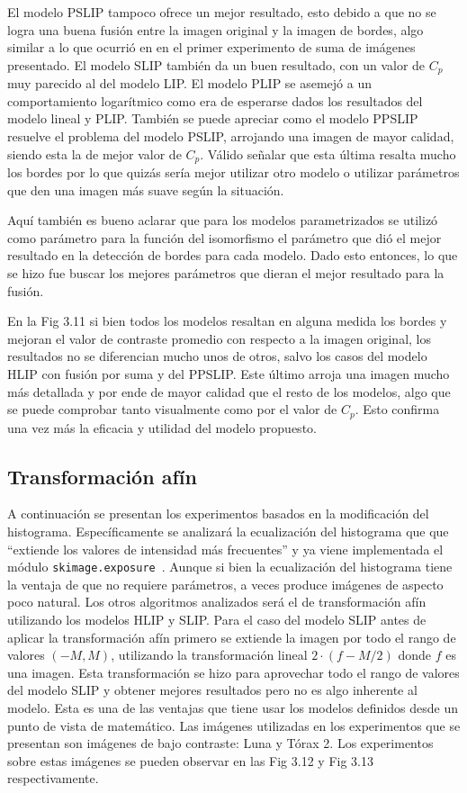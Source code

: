 El modelo PSLIP tampoco ofrece un mejor resultado, esto debido a que no se logra una buena fusi\'on entre la imagen original y la imagen de bordes, algo similar a lo que ocurri\'o en en el primer experimento de suma de im\'agenes presentado. El modelo SLIP tambi\'en da un buen resultado, con un valor de $C_p$ muy parecido al del modelo LIP. El modelo PLIP se asemej\'o a un comportamiento logar\'itmico como era de esperarse dados los resultados del modelo lineal y PLIP. Tambi\'en se puede apreciar como el modelo PPSLIP resuelve el problema del modelo PSLIP, arrojando una imagen de mayor calidad, siendo esta la de mejor valor de $C_p$. V\'alido se\~nalar que esta \'ultima resalta mucho los bordes por lo que quiz\'as ser\'ia mejor utilizar otro modelo o utilizar par\'ametros que den una imagen m\'as suave seg\'un la situaci\'on.

Aqu\'i tambi\'en es bueno aclarar que para los modelos parametrizados se utiliz\'o como par\'ametro para la funci\'on del isomorfismo el par\'ametro que di\'o el mejor resultado en la detecci\'on de bordes para cada modelo. Dado esto entonces, lo que se hizo fue buscar los mejores par\'ametros que dieran el mejor resultado para la fusi\'on.

En la Fig 3.11 si bien todos los modelos resaltan en alguna medida los bordes y mejoran el valor de contraste promedio con respecto a la imagen original, los resultados no se diferencian mucho unos de otros, salvo los casos del modelo HLIP con fusi\'on por suma y del PPSLIP. Este \'ultimo arroja una imagen mucho m\'as detallada y por ende de mayor calidad que el resto de los modelos, algo que se puede comprobar tanto visualmente como por el valor de $C_p$. Esto confirma una vez m\'as la eficacia y utilidad del modelo propuesto.

\subsection{Transformaci\'on af\'in}

A continuaci\'on se presentan los experimentos basados en la modificaci\'on del histograma. Espec\'ificamente se analizar\'a la ecualizaci\'on del histograma que  que ``extiende los valores de intensidad más frecuentes'' y ya viene implementada el m\'odulo \verb|skimage.exposure|~\cite{histogram_equalization}. Aunque si bien la ecualización del histograma tiene la ventaja de que no requiere parámetros, a veces produce imágenes de aspecto poco natural. Los otros algoritmos analizados ser\'a el de transformaci\'on af\'in utilizando los modelos HLIP y SLIP. Para el caso del modelo SLIP antes de aplicar la transformaci\'on af\'in primero se extiende la imagen por todo el rango de valores $(-M,M)$, utilizando la transformaci\'on lineal $2\cdot(f-M/2)$ donde $f$ es una imagen. Esta transformaci\'on se hizo para aprovechar todo el rango de valores del modelo SLIP y obtener mejores resultados pero no es algo inherente al modelo. Esta es una de las ventajas que tiene usar los modelos definidos desde un punto de vista de matem\'atico. Las im\'agenes utilizadas en los experimentos que se presentan son im\'agenes de bajo contraste: Luna y T\'orax 2. Los experimentos sobre estas im\'agenes se pueden observar en las Fig 3.12 y Fig 3.13 respectivamente.

